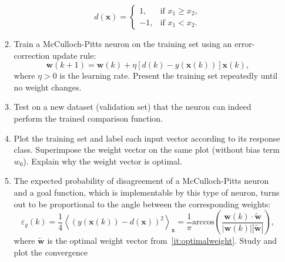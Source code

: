 \documentclass[12pt, a4]{article}
\begin{document}
\begin{enumerate}
\begin{enumerate}
                \begin{equation*}
                    d(\mathbf{x})=
                    \begin{cases}
                        1, & \text{if } x_1\geq x_2, \\
                        -1, & \text{if } x_1<x_2.
                    \end{cases}
                \end{equation*}
            \item Train a McCulloch-Pitts neuron on the training set
                using an error-correction update rule:
                \begin{equation}
                    \textbf{w}(k+1)=\mathbf{w}(k)+\eta
                    [d(k)-y(\mathbf{x}(k))]\mathbf{x}(k),
                    \label{eq:errorupdate}
                \end{equation}
                where $\eta>0$ is the learning rate.
                Present the training set repeatedly until no weight
                changes.
            \item Test on a new dataset (validation set) that the
                neuron can indeed perform the trained comparison function.
            \item\label{it:optimalweight} Plot the training set and label each
                input vector according to its response class. Superimpose the
                weight vector on the same plot (without bias term $w_0$).
                Explain why the weight vector is optimal.
            \item The expected probability of disagreement of a
                McCulloch-Pitts neuron and a goal function, which is
                implementable by this type of neuron, turns out to be
                proportional to the angle between the corresponding weights:
                \begin{equation}
                    \varepsilon_g(k) = \frac{1}{4} \left<
                    \left( y\left(\mathbf{x}\left(k\right)\right) -
                    d\left(\mathbf{x}\right) \right)^2 \right>_\mathbf{x} =
                    \frac{1}{\pi} \mathrm{arccos} \left( \frac{\mathbf{w}(k)
                    \cdot \mathbf{\tilde w}}{|\mathbf{w}(k)| |\mathbf{\tilde
                    w}|} \right),
                    \label{eq:generalizationerr}
                \end{equation}
                where $\mathbf{\tilde w}$ is the optimal weight vector
                from~\ref{it:optimalweight}. Study and plot the convergence

\end{enumerate}
\end{enumerate}
\end{document}
